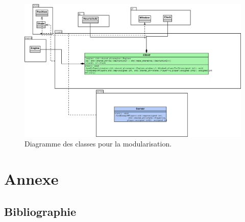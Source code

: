 \documentclass[a4paper,12pt]{article}
\begin{document}
    \begin{landscape}
    \begin{figure}[p]
    \includegraphics[width=0.9\paperheight]{module.png}
    \caption{\label{uml:module}Diagramme des classes pour la modularisation.}
    \end{figure}
    \end{landscape}
    
    \clearpage
    \section{Annexe}
    \label{sec:Annexe}
    \subsection{Bibliographie}

    
\end{document}
